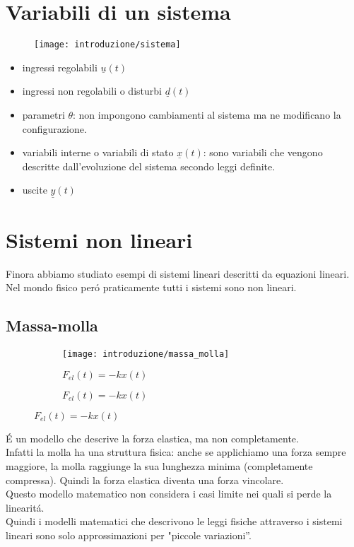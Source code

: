 \documentclass[../main.tex]{subfiles}
\begin{document}
		
	\section{Variabili di un sistema}
			\begin{figure}[h!]
				\centering
				\texttt{[image: introduzione/sistema]}
			\end{figure}
			\begin{itemize}
				\item ingressi regolabili $ \underline u(t) $
				\item ingressi non regolabili o disturbi $ \underline d(t) $
				\item parametri $ \theta $: non impongono cambiamenti al sistema ma ne modificano la configurazione.
				\item variabili interne o variabili di stato $ \underline x(t) $: sono variabili che vengono descritte dall'evoluzione del sistema secondo leggi definite.
				\item uscite $ \underline y(t) $
			\end{itemize}
		
	\section{Sistemi non lineari}
		Finora abbiamo studiato esempi di sistemi lineari descritti da equazioni lineari. Nel mondo fisico per\'o praticamente tutti i sistemi sono non lineari.
		
	\subsection{Massa-molla}
		\begin{figure}[h!]
			\centering
			\begin{subfigure}[b]{0.4\linewidth}
				\texttt{[image: introduzione/massa\_molla]}
				\caption{$F_{el}(t)=-kx(t)$}
			\end{subfigure}
			\begin{subfigure}[b]{0.4\linewidth}
				\caption{$F_{el}(t)=-kx(t)$}
			\end{subfigure}
		\end{figure}
		\'E un modello che descrive la forza elastica, ma non completamente.\\ Infatti la molla ha una struttura fisica: anche se applichiamo una forza sempre maggiore, la molla raggiunge la sua lunghezza minima (completamente compressa). Quindi la forza elastica diventa una forza vincolare.\\
		Questo modello matematico non considera i casi limite nei quali si perde la linearit\'a.\\
		Quindi i modelli matematici che descrivono le leggi fisiche attraverso i sistemi lineari sono solo approssimazioni per "piccole variazioni''.
		
\end{document}
